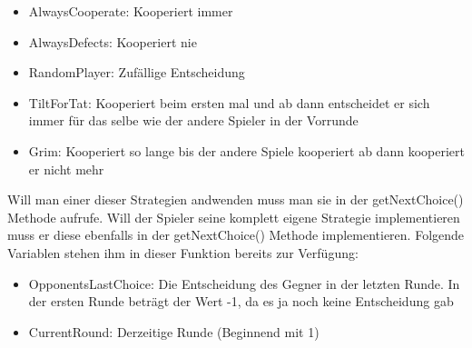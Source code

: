 \documentclass[12pt, letterpaper]{article}
\begin{document}
\begin{itemize}
	\item AlwaysCooperate: Kooperiert immer
	\item AlwaysDefects: Kooperiert nie
	\item RandomPlayer: Zufällige Entscheidung
	\item TiltForTat: Kooperiert beim ersten mal und ab dann entscheidet er sich immer für das selbe wie der andere Spieler in der Vorrunde
	\item Grim: Kooperiert so lange bis der andere Spiele kooperiert ab dann kooperiert er nicht mehr
\end{itemize}

\noindent
Will man einer dieser Strategien andwenden muss man sie in der getNextChoice() Methode aufrufe. Will der Spieler seine komplett eigene Strategie implementieren muss er diese ebenfalls in der getNextChoice() Methode implementieren. Folgende Variablen stehen ihm in dieser Funktion bereits zur Verfügung:

\begin{itemize}
	\item OpponentsLastChoice: Die Entscheidung des Gegner in der letzten Runde. In der ersten Runde beträgt der Wert -1, da es ja noch keine Entscheidung gab
	\item CurrentRound: Derzeitige Runde (Beginnend mit 1)
\end{itemize}
\end{document}
